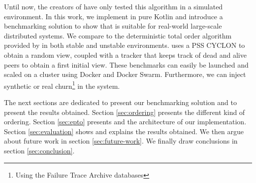 \par
Until now, the creators of \epto have only tested this algorithm in a simulated environment. In this work, we implement \epto in pure Kotlin and introduce a benchmarking solution to show that \epto is suitable for real-world large-scale distributed systems. We compare \epto to the deterministic total order algorithm provided by \jgroups \autocite{jgroups} in both stable and unstable environments. \epto uses a PSS CYCLON to obtain a random view, coupled with a tracker that keeps track of dead and alive peers to obtain a first initial view. These benchmarks can easily be launched and scaled on a cluster using Docker and Docker Swarm. Furthermore, we can inject synthetic or real churn\footnote{Using the Failure Trace Archive databases} in the system.
\par
The next sections are dedicated to present our benchmarking solution and to present the results obtained. Section \ref{sec:ordering} presents the different kind of ordering. Section \ref{sec:epto} presents \epto and the architecture of our implementation. Section \ref{sec:evaluation} shows and explains the results obtained. We then argue about future work in section \ref{sec:future-work}. We finally draw conclusions in section \ref{sec:conclusion}.